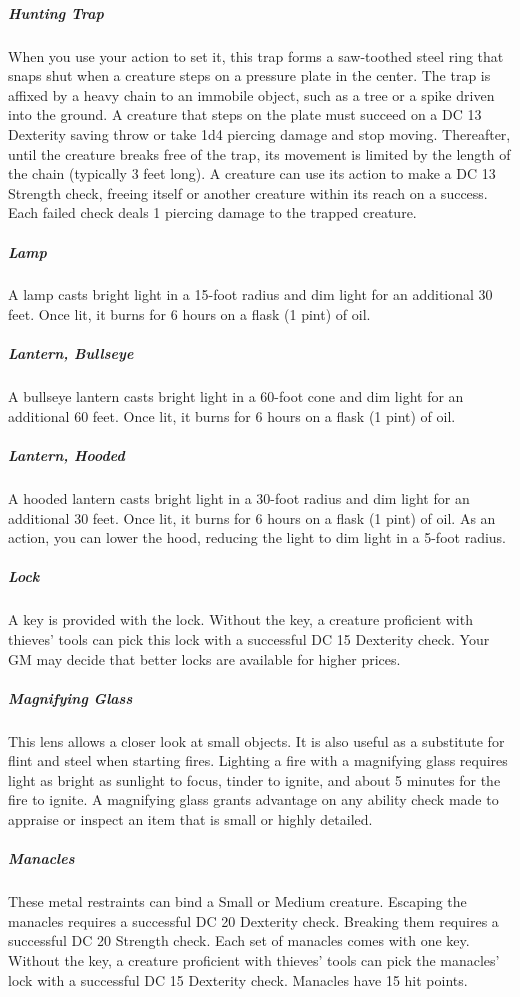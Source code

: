 \subparagraph*{Hunting Trap} When you use your action to set it, this trap forms a saw-toothed steel ring that snaps shut when a creature steps on a pressure plate in the center. The trap is affixed by a heavy chain to an immobile object, such as a tree or a spike driven into the ground. A creature that steps on the plate must succeed on a DC 13 Dexterity saving throw or take 1d4 piercing damage and stop moving. Thereafter, until the creature breaks free of the trap, its movement is limited by the length of the chain (typically 3 feet long). A creature can use its action to make a DC 13 Strength check, freeing itself or another creature within its reach on a success. Each failed check deals 1 piercing damage to the trapped creature.

\subparagraph*{Lamp} A lamp casts bright light in a 15-foot radius and dim light for an additional 30 feet. Once lit, it burns for 6 hours on a flask (1 pint) of oil.
\subparagraph*{Lantern, Bullseye} A bullseye lantern casts bright light in a 60-foot cone and dim light for an additional 60 feet. Once lit, it burns for 6 hours on a flask (1 pint) of oil.
\subparagraph*{Lantern, Hooded} A hooded lantern casts bright light in a 30-foot radius and dim light for an additional 30 feet. Once lit, it burns for 6 hours on a flask (1 pint) of oil. As an action, you can lower the hood, reducing the light to dim light in a 5-foot radius.

\subparagraph*{Lock} A key is provided with the lock. Without the key, a creature proficient with thieves' tools can pick this lock with a successful DC 15 Dexterity check. Your GM may decide that better locks are available for higher prices.

\subparagraph*{Magnifying Glass} This lens allows a closer look at small objects. It is also useful as a substitute for flint and steel when starting fires. Lighting a fire with a magnifying glass requires light as bright as sunlight to focus, tinder to ignite, and about 5 minutes for the fire to ignite. A magnifying glass grants advantage on any ability check made to appraise or inspect an item that is small or highly detailed.

\subparagraph*{Manacles} These metal restraints can bind a Small or Medium creature. Escaping the manacles requires a successful DC 20 Dexterity check. Breaking them requires a successful DC 20 Strength check. Each set of manacles comes with one key. Without the key, a creature proficient with thieves' tools can pick the manacles' lock with a successful DC 15 Dexterity check. Manacles have 15 hit points.


